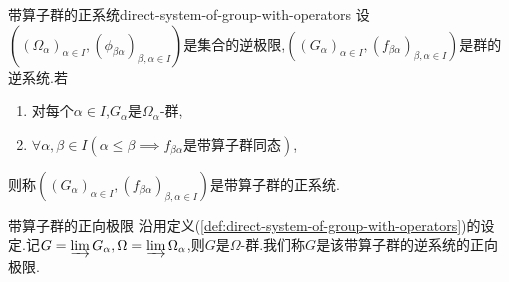 \begin{definition}{带算子群的正系统}{direct-system-of-group-with-operators}
	设$\left(\left(\Omega_{\alpha}\right)_{\alpha\in I},\left(\phi_{\beta\alpha}\right)_{\beta,\alpha\in I}\right)$是集合的逆极限,$\left(\left(G_{\alpha}\right)_{\alpha\in I},\left(f_{\beta\alpha}\right)_{\beta,\alpha\in I}\right)$是群的逆系统.若
	\begin{enumerate}
		\item 对每个$\alpha\in I$,$G_{\alpha}$是$\Omega_{\alpha}$-群,
		\item $\forall\alpha,\beta\in I\left(\alpha\leq\beta\implies f_{\beta\alpha}\text{是带算子群同态}\right)$,
	\end{enumerate}
	则称$\left(\left(G_{\alpha}\right)_{\alpha\in I},\left(f_{\beta\alpha}\right)_{\beta,\alpha\in I}\right)$是带算子群的正系统.
\end{definition}

\begin{definition}{带算子群的正向极限}{}
	沿用定义(\cref{def:direct-system-of-group-with-operators})的设定.记$G=\varinjlim G_{\alpha},\Omega=\varinjlim\Omega_{\alpha}$,则$G$是$\Omega$-群.我们称$G$是该带算子群的逆系统的正向极限.
\end{definition}